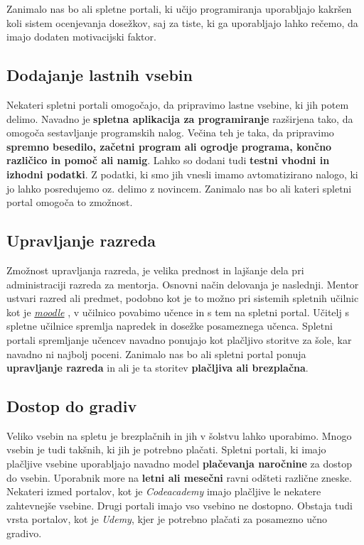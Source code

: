 Zanimalo nas bo ali spletne portali, ki učijo programiranja
uporabljajo kakršen koli sistem ocenjevanja dosežkov, saj za tiste, ki
ga uporabljajo lahko rečemo, da imajo dodaten motivacijski faktor.

\subsection{Dodajanje lastnih vsebin}
\label{sec:dodajanje_vsebin}

Nekateri spletni portali omogočajo, da pripravimo lastne vsebine, ki
jih potem delimo. Navadno je \textbf{spletna aplikacija za
  programiranje} razširjena tako, da omogoča sestavljanje programskih
nalog. Večina teh je taka, da pripravimo \textbf{spremno besedilo,
  začetni program ali ogrodje programa, končno različico in pomoč ali
  namig}. Lahko so dodani tudi \textbf{testni vhodni in izhodni
  podatki}. Z podatki, ki smo jih vnesli imamo avtomatizirano nalogo,
ki jo lahko posredujemo oz. delimo z novincem. Zanimalo nas bo ali
kateri spletni portal omogoča to zmožnost.

\subsection{Upravljanje razreda}
\label{sec:upravljanje_razreda}

Zmožnost upravljanja razreda, je velika prednost in lajšanje dela pri
administraciji razreda za mentorja. Osnovni način delovanja je
naslednji. Mentor ustvari razred ali predmet, podobno kot je to možno
pri sistemih spletnih učilnic kot je
\emph{\href{https://moodle.org/}{moodle}} \cite{web:moodle_site}, v
učilnico povabimo učence in s tem na spletni portal. Učitelj s spletne
učilnice spremlja napredek in dosežke posameznega učenca. Spletni
portali spremljanje učencev navadno ponujajo kot plačljivo storitve za
šole, kar navadno ni najbolj poceni. Zanimalo nas bo ali spletni
portal ponuja \textbf{upravljanje razreda} in ali je ta storitev
\textbf{plačljiva ali brezplačna}.

\subsection{Dostop do gradiv}
\label{sec:dostop_do_gradiv}

Veliko vsebin na spletu je brezplačnih in jih v šolstvu lahko
uporabimo. Mnogo vsebin je tudi takšnih, ki jih je potrebno
plačati. Spletni portali, ki imajo plačljive vsebine uporabljajo
navadno model \textbf{plačevanja naročnine} za dostop do
vsebin. Uporabnik more na \textbf{letni ali mesečni} ravni odšteti
različne zneske. Nekateri izmed portalov, kot je \emph{Codeacademy}
imajo plačljive le nekatere zahtevnejše vsebine. Drugi portali imajo
vso vsebino ne dostopno. Obstaja tudi vrsta portalov, kot je
\emph{Udemy}, kjer je potrebno plačati za posamezno učno gradivo.

